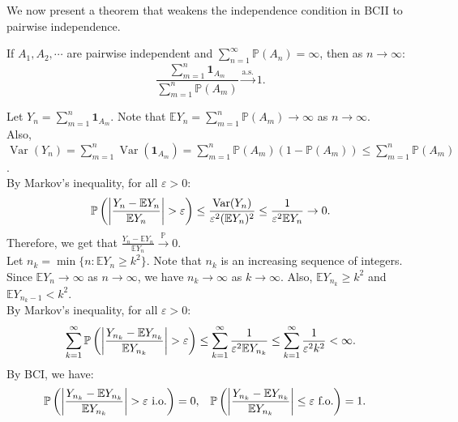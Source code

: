 \documentclass{huhtakm-template-book-v2}
\newcommand{\prob}{\mathbb{P}}
\newcommand{\expect}{\mathbb{E}}
\DeclareMathOperator{\Var}{Var}
\begin{document}
    We now present a theorem that weakens the independence condition in BCII to pairwise independence.
    \begin{thm}
        If $A_{1},A_{2},\cdots$ are pairwise independent and $\sum_{n = 1}^{\infty}\prob(A_{n}) = \infty$, then as $n \to \infty$:
        \begin{equation*}
            \frac{\sum_{m = 1}^{n}\mathbf{1}_{A_{m}}}{\sum_{m = 1}^{n}\prob(A_{m})} \xrightarrow{\text{a.s.}} 1.
        \end{equation*}
    \end{thm}
    \begin{proofing}
        Let $Y_{n} = \sum_{m = 1}^{n}\mathbf{1}_{A_{m}}$. Note that $\expect{Y_{n}} = \sum_{m = 1}^{n}\prob(A_{m}) \to \infty$ as $n \to \infty$.\\
        Also, $\Var(Y_{n}) = \sum_{m = 1}^{n}\Var(\mathbf{1}_{A_{m}}) = \sum_{m = 1}^{n}\prob(A_{m})(1-\prob(A_{m})) \leq \sum_{m = 1}^{n}\prob(A_{m})$.\\
        By Markov's inequality, for all $\varepsilon > 0$:
        \begin{equation*}
            \prob\left(\abs{\frac{Y_{n}-\expect{Y_{n}}}{\expect{Y_{n}}}} > \varepsilon\right) \leq \frac{\Var(Y_{n})}{\varepsilon^{2}(\expect{Y_{n}})^{2}} \leq \frac{1}{\varepsilon^{2}\expect{Y_{n}}} \to 0.
        \end{equation*}
        Therefore, we get that $\frac{Y_{n}-\expect{Y_{n}}}{\expect{Y_{n}}} \xrightarrow{\prob} 0$.\\
        Let $n_{k} = \min\{n:\expect{Y_{n}} \geq k^{2}\}$. Note that $n_{k}$ is an increasing sequence of integers.\\
        Since $\expect{Y_{n}} \to \infty$ as $n \to \infty$, we have $n_{k} \to \infty$ as $k \to \infty$. Also, $\expect{Y_{n_{k}}} \geq k^{2}$ and $\expect{Y_{n_{k}-1}} < k^{2}$.\\
        By Markov's inequality, for all $\varepsilon > 0$:
        \begin{equation*}
            \sum_{k = 1}^{\infty}\prob\left(\abs{\frac{Y_{n_{k}}-\expect{Y_{n_{k}}}}{\expect{Y_{n_{k}}}}} > \varepsilon\right) \leq \sum_{k = 1}^{\infty}\frac{1}{\varepsilon^{2}\expect{Y_{n_{k}}}} \leq \sum_{k = 1}^{\infty}\frac{1}{\varepsilon^{2}k^{2}} < \infty.
        \end{equation*}
        By BCI, we have:
        \begin{align*}
            \prob\left(\abs{\frac{Y_{n_{k}}-\expect{Y_{n_{k}}}}{\expect{Y_{n_{k}}}}} > \varepsilon\text{ i.o.}\right) &= 0, & \prob\left(\abs{\frac{Y_{n_{k}}-\expect{Y_{n_{k}}}}{\expect{Y_{n_{k}}}}} \leq \varepsilon\text{ f.o.}\right) &= 1.

\end{align*}
\end{proofing}
\end{document}
